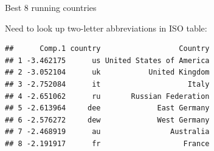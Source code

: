 \documentclass[ignorenonframetext,]{beamer}
\newenvironment{Shaded}{\begin{snugshade}}{\end{snugshade}}
\newcommand{\DataTypeTok}[1]{\textcolor[rgb]{0.13,0.29,0.53}{#1}}
\newcommand{\DecValTok}[1]{\textcolor[rgb]{0.00,0.00,0.81}{#1}}
\newcommand{\FloatTok}[1]{\textcolor[rgb]{0.00,0.00,0.81}{#1}}
\newcommand{\KeywordTok}[1]{\textcolor[rgb]{0.13,0.29,0.53}{\textbf{#1}}}
\newcommand{\NormalTok}[1]{#1}
\newcommand{\OperatorTok}[1]{\textcolor[rgb]{0.81,0.36,0.00}{\textbf{#1}}}
\newcommand{\StringTok}[1]{\textcolor[rgb]{0.31,0.60,0.02}{#1}}
\begin{document}
\begin{frame}[fragile]{Best 8 running countries}
\protect\hypertarget{best-8-running-countries}{}

Need to look up two-letter abbreviations in ISO table:

\footnotesize

\begin{Shaded}
\end{Shaded}

\begin{verbatim}
##      Comp.1 country                  Country
## 1 -3.462175      us United States of America
## 2 -3.052104      uk           United Kingdom
## 3 -2.752084      it                    Italy
## 4 -2.651062      ru       Russian Federation
## 5 -2.613964     dee             East Germany
## 6 -2.576272     dew             West Germany
## 7 -2.468919      au                Australia
## 8 -2.191917      fr                   France
\end{verbatim}

\normalsize

\end{frame}
\end{document}
